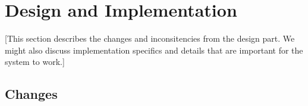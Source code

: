 \section{Design and Implementation}\label{Design and Implementation}
    [This section describes the changes and inconsitencies from the design part. We might also discuss implementation specifics and details that are important for the system to work.]

    
    
    
    \subsection{Changes}\label{Changes}
